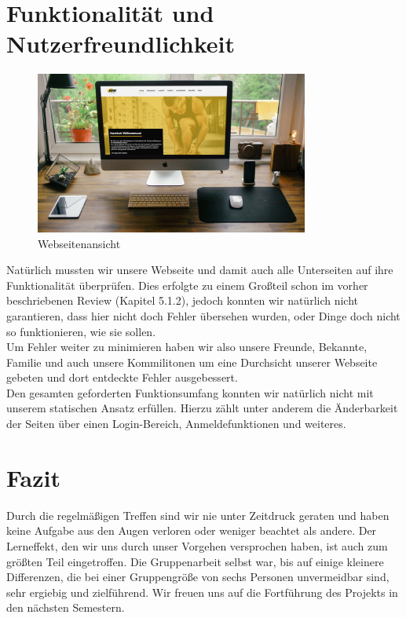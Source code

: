 \documentclass[12pt,a4paper]{article}
\begin{document}
\section{Funktionalität und Nutzerfreundlichkeit}
\begin{figure}
  \includegraphics[width=9cm]{Home_Desktop.jpg}
  \caption{Webseitenansicht}
\end{figure}
Natürlich mussten wir unsere Webseite und damit auch alle Unterseiten auf ihre Funktionalität überprüfen. Dies erfolgte zu einem Großteil schon im vorher beschriebenen Review (Kapitel 5.1.2), jedoch konnten wir natürlich nicht garantieren, dass hier nicht doch Fehler übersehen wurden, oder Dinge doch nicht so funktionieren, wie sie sollen.\\
Um Fehler weiter zu minimieren haben wir also unsere Freunde, Bekannte, Familie und auch unsere Kommilitonen um eine Durchsicht unserer Webseite gebeten und dort entdeckte Fehler ausgebessert.\\
Den gesamten geforderten Funktionsumfang konnten wir natürlich nicht mit unserem statischen Ansatz erfüllen. Hierzu zählt unter anderem die Änderbarkeit der Seiten über einen Login-Bereich, Anmeldefunktionen und weiteres.
\section{Fazit}
Durch die regelmäßigen Treffen sind wir nie unter Zeitdruck geraten und haben keine Aufgabe aus den Augen verloren oder weniger beachtet als andere. Der Lerneffekt, den wir uns durch unser Vorgehen versprochen haben, ist auch zum größten Teil eingetroffen.
Die Gruppenarbeit selbst war, bis auf einige kleinere Differenzen, die bei einer Gruppengröße von sechs Personen unvermeidbar sind, sehr ergiebig und zielführend.
Wir freuen uns auf die Fortführung des Projekts in den nächsten Semestern.
\end{document}
